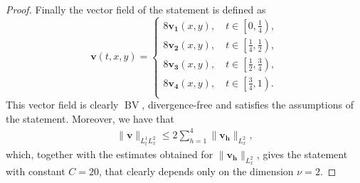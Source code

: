 \documentclass[12 pt]{article}
\theoremstyle{definition} \newtheorem{definition}{Definition}[section]
\theoremstyle{definition} \newtheorem{remark}[definition]{Remark}
\theoremstyle{plain} \newtheorem{lemma}[definition]{Lemma}
\theoremstyle{plain} \newtheorem{proposition}[definition]{Proposition}
\theoremstyle{plain} \newtheorem{theorem}[definition]{Theorem}
\theoremstyle{plain} \newtheorem{corollary}[definition]{Corollary}
\theoremstyle{definition} \newtheorem{example}[definition]{Example}
\theoremstyle{definition} \newtheorem{assumption}[definition]{Assumption}
\theoremstyle{definition} \newtheorem{conjecture}[definition]{Conjecture}
\DeclareMathOperator{\BV}{BV}
\newcommand{\1}{\mathbbm 1}
\numberwithin{equation}{section}
\begin{document}
\begin{appendix}
\begin{proof}
        Finally the vector field of the statement is defined as 
         \begin{equation*}
     \mathbf v(t,x,y)=\begin{cases}
         8 \mathbf{v_1}(x,y), \quad t\in\left[0,\frac{1}{4}\right), \\
         8 \mathbf{v_2}(x,y), \quad 
  t\in\left[\frac{1}{4},\frac{1}{2}\right), \\
         8 \mathbf{v_3}(x,y), \quad t\in\left[\frac{1}{2},\frac{3}{4}\right), \\
         8 \mathbf{v_4}(x,y), \quad t\in\left[\frac{3}{4},1\right).\\
     \end{cases}
 \end{equation*}
        This vector field is clearly $\BV$, divergence-free and satisfies the assumptions of the statement. Moreover, we have that
        \begin{align*}
             \|\mathbf v\|_{L^1_tL^2_x}\leq 2\sum_{h=1}^4\|\mathbf{v_h}\|_{L^2_x},
        \end{align*}
        which, together with the estimates obtained for $\|\mathbf{v_h}\|_{L^2_x}$, gives the statement with constant $C=20$, that clearly depends only on the dimension $\nu=2$. 
\end{proof}
\end{appendix}


\end{document}
